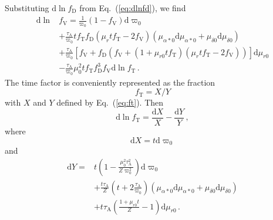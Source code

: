 \documentclass{aa}
\begin{document}
Substituting $\mathrm{d}\ln f_\mathrm{D}$ from Eq.~(\ref{eq:dlnfd}), we find
\begin{equation}\label{eq:dlnfv}
 \begin{aligned}
    \mathrm{d}\ln &f_\mathrm{V}=
    \frac{1}{\varpi_0}\left(1-f_\mathrm{V}\right)\mathrm{d}\varpi_0\\
    &+\frac{\tau_\mathrm{A}}{\varpi_0}
    tf_\mathrm{T}f_\mathrm{D}\left(\mu_rtf_\mathrm{T}-2f_\mathrm{V}\right)
    \left(\mu_{\alpha*0}\mathrm{d}\mu_{\alpha*0}+\mu_{\delta0}\mathrm{d}\mu_{\delta0}\right)\\
    &+\frac{\tau_\mathrm{A}}{\varpi_0}
    \left[f_\mathrm{V}
    +f_\mathrm{D}\left(f_\mathrm{V}+\left(1+\mu_{r0}tf_\mathrm{T}\right)\left(\mu_rtf_\mathrm{T}-2f_\mathrm{V}\right)\right)
    \right]\mathrm{d}\mu_{r0}\\
    &-\frac{\tau_\mathrm{A}}{\varpi_0}
    \mu_0^2tf_\mathrm{T}f_\mathrm{D}^3f_\mathrm{V}\mathrm{d}\ln f_\mathrm{T} \, .
 \end{aligned}
\end{equation}
The time factor is conveniently represented as the fraction
\begin{equation}\label{eq:ft_as_fraction}
    f_\mathrm{T}=X/Y
\end{equation}
with $X$ and $Y$ defined by Eq.~(\ref{eq:ft}). Then
\begin{equation}\label{eq:dlnft}
    \mathrm{d}\ln f_\mathrm{T}=\frac{\mathrm{d}X}{X}-\frac{\mathrm{d}Y}{Y}\,,
\end{equation}
where
\begin{equation}\label{eq:dX}
    \mathrm{d}X=t\mathrm{d}\varpi_0
\end{equation}
and
\begin{equation}\label{eq:dY}
 \begin{aligned}
    \mathrm{d}Y=
    &t\left(1-\frac{\mu_0^2\tau_\mathrm{A}^2}{Z\varpi_0^2}\right)\mathrm{d}\varpi_0\\
    &+
    \frac{t\tau_\mathrm{A}}{Z}
    \left(t+2\frac{\tau_\mathrm{A}}{\varpi_0}\right)
    \left(\mu_{\alpha*0}\mathrm{d}\mu_{\alpha*0}+\mu_{\delta0}\mathrm{d}\mu_{\delta0}\right)\\
    &+t\tau_\mathrm{A}\left(\frac{1+\mu_{r0}t}{Z}-1\right)\mathrm{d}\mu_{r0} \, .
 \end{aligned}
\end{equation}
\end{document}
